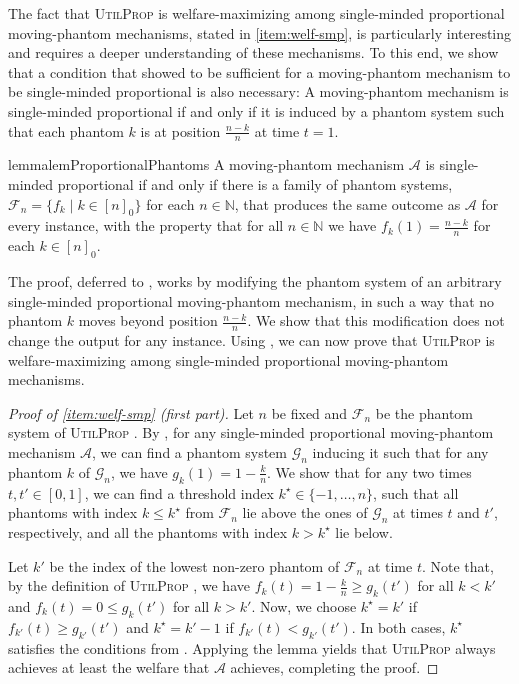 \documentclass[11pt]{article}
\newcommand{\F}{\mathcal{F}}
\newcommand{\G}{\mathcal{G}}
\newcommand{\A}{\mathcal{A}}
\newcommand{\N}{\mathbb{N}}
\newcommand{\UtP}{\textsc{UtilProp} }
\begin{document}
The fact that \UtP is welfare-maximizing among single-minded proportional moving-phantom mechanisms, stated in \cref{item:welf-smp}, is particularly interesting and requires a deeper understanding of these mechanisms. 
To this end, we show that a condition that \citet{freeman2021truthful} showed to be sufficient for a moving-phantom mechanism to be single-minded proportional is also necessary:
A moving-phantom mechanism is single-minded proportional if and only if it is induced by a phantom system such that each phantom $k$ is at position $\frac{n-k}{n}$ at time $t = 1$. 

\begin{restatable}{lemma}{lemProportionalPhantoms}\label{lem:proportional_phantoms_characterization}
    A moving-phantom mechanism $\A$ is single-minded proportional if and only if there is a family of phantom systems, $\F_n = \{f_k \mid k \in [n]_0\}$ for each $n \in \N$, that produces the same outcome as $\A$ for every instance, with the property that for all $n \in \N$ we have $f_k(1) = \frac{n-k}{n}$ for each $k \in [n]_0$.
\end{restatable}

The proof, deferred to , works by modifying the phantom system of an arbitrary single-minded proportional moving-phantom mechanism, in such a way that no phantom $k$ moves beyond position $\frac{n-k}{n}$. We show that this modification does not change the output for any instance. Using , we can now prove that \UtP is welfare-maximizing among single-minded proportional moving-phantom mechanisms.

\begin{proof}[Proof of  \textnormal{\ref{item:welf-smp}} (first part)]
    
    Let $n$ be fixed and $\F_n$ be the phantom system of \UtP. By , for any single-minded proportional moving-phantom mechanism $\A$, we can find a phantom system $\G_n$ inducing it such that for any phantom $k$ of $\G_n$, we have $g_k(1) = 1 - \frac{k}{n}$.
    We show that for any two times $t, t' \in [0,1]$, we can find a threshold index $k^\star\in \{-1,\ldots,n\}$, such that all phantoms with index $k \le k^\star$ from $\F_n$ lie above the ones of $\G_n$ at times $t$ and $t'$, respectively, and all the phantoms with index $k > k^\star$ lie below. %
    
    Let $k'$ be the index of the lowest non-zero phantom of $\F_n$ at time $t$. Note that, by the definition of \UtP, we have $f_{k}(t) = 1 - \frac{k}{n} \ge g_{k}(t')$ for all $k < k'$ and $f_{k}(t) = 0 \le g_{k}(t')$ for all $k > k'$. Now, we choose $k^\star = k'$ if $f_{k'}(t) \ge g_{k'}(t')$ and $k^\star = k'-1$ if $f_{k'}(t) < g_{k'}(t')$. In both cases, $k^\star$ satisfies the conditions from . Applying the lemma yields that \UtP always achieves at least the welfare that $\A$ achieves, completing the proof.
\end{proof}
\end{document}
